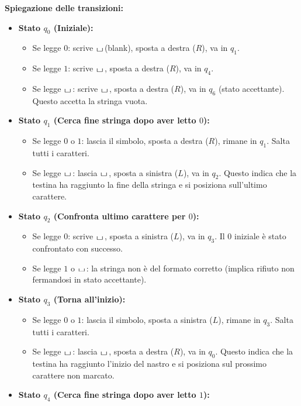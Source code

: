 \documentclass[a4paper]{article}
\theoremstyle{definition} %
\newcommand{\blankS}{\ensuremath{\raisebox{-0.15ex}{\scalebox{1.3}[0.7]{$\sqcup$}}\mkern2mu}}
\begin{document}
\vspace{0.5cm}
\noindent \textbf{Spiegazione delle transizioni:}
\begin{itemize}
    \item \textbf{Stato $q_0$ (Iniziale):}
    \begin{itemize}
        \item Se legge $0$: scrive \blankS (blank), sposta a destra ($R$), va in $q_1$.
        \item Se legge $1$: scrive \blankS, sposta a destra ($R$), va in $q_4$.
        \item Se legge \blankS: scrive \blankS, sposta a destra ($R$), va in $q_6$ (stato accettante). Questo accetta la stringa vuota.
    \end{itemize}
    \item \textbf{Stato $q_1$ (Cerca fine stringa dopo aver letto $0$):}
    \begin{itemize}
        \item Se legge $0$ o $1$: lascia il simbolo, sposta a destra ($R$), rimane in $q_1$. Salta tutti i caratteri.
        \item Se legge \blankS: lascia \blankS, sposta a sinistra ($L$), va in $q_2$. Questo indica che la testina ha raggiunto la fine della stringa e si posiziona sull'ultimo carattere.
    \end{itemize}
    \item \textbf{Stato $q_2$ (Confronta ultimo carattere per $0$):}
    \begin{itemize}
        \item Se legge $0$: scrive \blankS, sposta a sinistra ($L$), va in $q_3$. Il $0$ iniziale è stato confrontato con successo.
        \item Se legge $1$ o \blankS: la stringa non è del formato corretto (implica rifiuto non fermandosi in stato accettante).
    \end{itemize}
    \item \textbf{Stato $q_3$ (Torna all'inizio):}
    \begin{itemize}
        \item Se legge $0$ o $1$: lascia il simbolo, sposta a sinistra ($L$), rimane in $q_3$. Salta tutti i caratteri.
        \item Se legge \blankS: lascia \blankS, sposta a destra ($R$), va in $q_0$. Questo indica che la testina ha raggiunto l'inizio del nastro e si posiziona sul prossimo carattere non marcato.
    \end{itemize}
    \item \textbf{Stato $q_4$ (Cerca fine stringa dopo aver letto $1$):}

\end{itemize}
\end{document}
